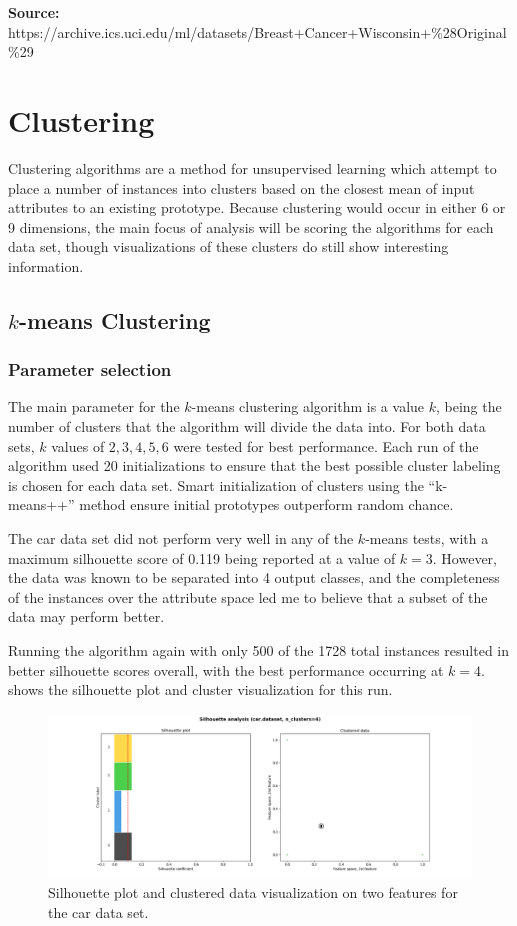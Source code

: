 \documentclass{article}
\begin{document}
      \textbf{Source:} https://archive.ics.uci.edu/ml/datasets/Breast+Cancer+Wisconsin+\%28Original\%29

  \section{Clustering}
    Clustering algorithms are a method for unsupervised learning which attempt to place a number of instances into clusters based on the closest mean of input attributes to an existing prototype. Because clustering would occur in either 6 or 9 dimensions, the main focus of analysis will be scoring the algorithms for each data set, though visualizations of these clusters do still show interesting information.

    \subsection{$k$-means Clustering}
      \subsubsection{Parameter selection}
        The main parameter for the $k$-means clustering algorithm is a value $k$, being the number of clusters that the algorithm will divide the data into. For both data sets, $k$ values of $2, 3, 4, 5, 6$ were tested for best performance. Each run of the algorithm used 20 initializations to ensure that the best possible cluster labeling is chosen for each data set. Smart initialization of clusters using the ``k-means++'' method ensure initial prototypes outperform random chance.

        The car data set did not perform very well in any of the $k$-means tests, with a maximum silhouette score of 0.119 being reported at a value of $k=3$. However, the data was known to be separated into 4 output classes, and the completeness of the instances over the attribute space led me to believe that a subset of the data may perform better.

        Running the algorithm again with only 500 of the 1728 total instances resulted in better silhouette scores overall, with the best performance occurring at $k=4$.  shows the silhouette plot and cluster visualization for this run.

        \begin{figure}[htb]
        \centering
        \includegraphics[width=\linewidth]{out/kmeans/car-4-clusters.png}
        \caption{Silhouette plot and clustered data visualization on two features for the car data set.}
        \label{fig:km-silhouette-car}
        \end{figure}
\end{document}

